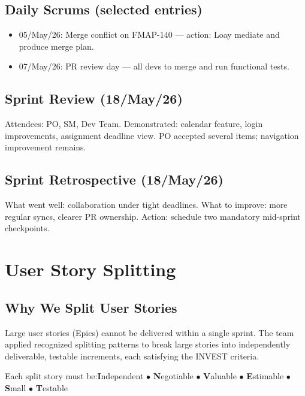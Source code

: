 \documentclass[12pt,a4paper]{article}
\begin{document}
\subsection{Daily Scrums (selected entries)}

\begin{itemize}
\item 05/May/26: Merge conflict on FMAP-140 --- action: Loay mediate and produce merge plan.
\item 07/May/26: PR review day --- all devs to merge and run functional tests.
\end{itemize}

\subsection{Sprint Review (18/May/26)}

Attendees: PO, SM, Dev Team. Demonstrated: calendar feature, login improvements, assignment deadline view. PO accepted several items; navigation improvement remains.

\subsection{Sprint Retrospective (18/May/26)}

What went well: collaboration under tight deadlines. What to improve: more regular syncs, clearer PR ownership. Action: schedule two mandatory mid-sprint checkpoints.
\newpage
\section{User Story Splitting}

\subsection{Why We Split User Stories}

\begin{tcolorbox}[notebox]
Large user stories (Epics) cannot be delivered within a single sprint. The team applied recognized splitting patterns to break large stories into independently deliverable, testable increments, each satisfying the INVEST criteria.
\end{tcolorbox}

\vspace{8pt}
\begin{tcolorbox}[enhanced,colback=agileaccent!8,colframe=agileaccent,boxrule=1pt,arc=4pt,title={\textbf{INVEST Criteria}},fonttitle=\bfseries\color{white},attach boxed title to top left={yshift=-3mm,xshift=6mm},boxed title style={colback=agileaccent,arc=3pt}]
Each split story must be:\quad\textbf{I}ndependent $\bullet$ \textbf{N}egotiable $\bullet$ \textbf{V}aluable $\bullet$ \textbf{E}stimable $\bullet$ \textbf{S}mall $\bullet$ \textbf{T}estable
\end{tcolorbox}
\end{document}
